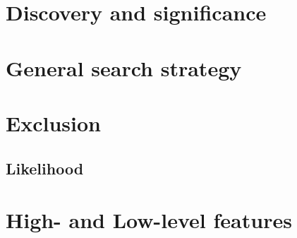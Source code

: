 
\section{Discovery and significance}
\section{General search strategy}

\section{Exclusion}
\subsection{Likelihood}
\section{High- and Low-level features}


